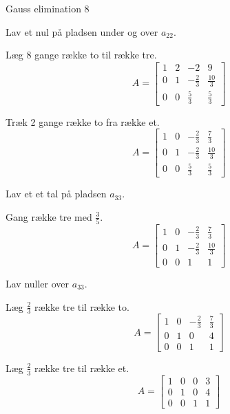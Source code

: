 \documentclass{article}
\begin{document}
\begin{exercise}{Gauss elimination 8}
	
	\hint
	Lav et nul på pladsen under og over $a_{22}$.
	
	\hint
	Læg 8 gange række to til række tre.
	\[
	A = \left[\begin{array}{rrr|r}
	1 & 2 & -2 & 9 \\
	0 & 1 & -\frac{2}{3} & \frac{10}{3} \\
	0 & 0 & \frac{5}{3} & \frac{5}{3}
	\end{array} \right]
	\]
	
	\hint
	Træk 2 gange række to fra række et.
	\[
	A = \left[\begin{array}{rrr|r}
	1 & 0  & -\frac{2}{3} & \frac{7}{3} \\
	0 & 1 & -\frac{2}{3} & \frac{10}{3} \\
	0 & 0 & \frac{5}{3} & \frac{5}{3}
	\end{array} \right]
	\]
	
	\hint
	Lav et et tal på pladsen $a_{33}$.
	
	\hint
	Gang række tre med $\frac{3}{5}$.
	\[
	A = \left[\begin{array}{rrr|r}
	1 & 0  & -\frac{2}{3} & \frac{7}{3} \\
	0 & 1 & -\frac{2}{3} & \frac{10}{3} \\
	0 & 0 & 1 & 1
	\end{array} \right]
	\]
	
	\hint
	Lav nuller over $a_{33}$.
	
	\hint
	Læg $\frac{2}{3}$ række tre til række to.
	\[
	A = \left[\begin{array}{rrr|r}
	1 & 0  & -\frac{2}{3} & \frac{7}{3} \\
	0 & 1 & 0 & 4  \\
	0 & 0 & 1 & 1
	\end{array} \right]
	\]
	
	\hint
	Læg $\frac{2}{3}$ række tre til række et.
	\[
	A = \left[\begin{array}{rrr|r}
	1 & 0 & 0 & 3 \\
	0 & 1 & 0 & 4\\
	0 & 0 & 1 & 1
	\end{array} \right]
	\]
	
	
\end{exercise}
\end{document}

